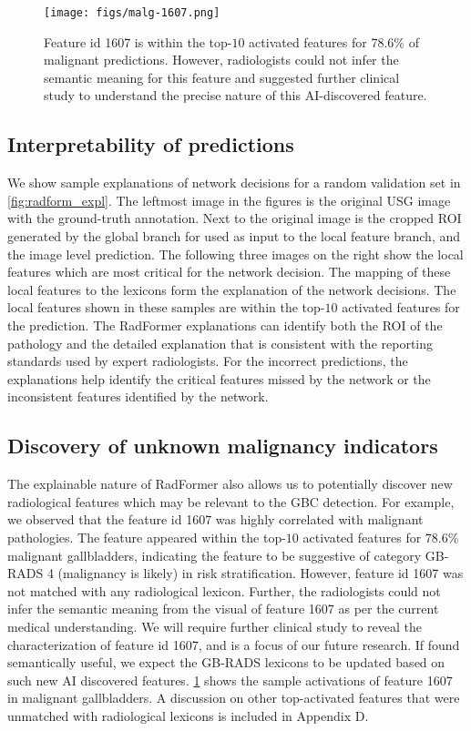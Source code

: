 \documentclass[twocolumn,final]{elsarticle}
\def\myarch{RadFormer\xspace}
\begin{document}
\begin{figure}[t]
	\centering
	\texttt{[image: figs/malg-1607.png]}
	\caption{Feature id 1607 is within the top-$10$ activated features for 78.6\% of malignant predictions. However, radiologists could not infer the semantic meaning for this feature and suggested further clinical study to understand the precise nature of this AI-discovered feature.}
	\label{fig:unknown_feat}
\end{figure}

\subsection{Interpretability of predictions}
%
We show sample explanations of network decisions for a random validation set in \cref{fig:radform_expl}. The leftmost image in the figures is the original USG image with the ground-truth annotation. Next to the original image is the cropped ROI generated by the global branch for used as input to the local feature branch, and the image level prediction. The following three images on the right show the local features which are most critical for the network decision. The mapping of these local features to the lexicons form the explanation of the network decisions. The local features shown in these samples are within the top-$10$ activated features for the prediction. The \myarch explanations can identify both the ROI of the pathology and the detailed explanation that is consistent with the reporting standards used by expert radiologists. For the incorrect predictions, the explanations help identify the critical features missed by the network or the inconsistent features identified by the network. 

\subsection{Discovery of unknown malignancy indicators}

The explainable nature of \myarch also allows us to potentially discover new radiological features which may be relevant to the GBC detection. For example, we observed that the feature id 1607 was highly correlated with malignant pathologies. The feature appeared within the top-$10$ activated features for 78.6\% malignant gallbladders, indicating the feature to be suggestive of category GB-RADS 4 (malignancy is likely) in risk stratification. However, feature id 1607 was not matched with any radiological lexicon. Further, the radiologists could not infer the semantic meaning from the visual of feature 1607 as per the current medical understanding. We will require further clinical study to reveal the characterization of feature id 1607, and is a focus of our future research. If found semantically useful, we expect the GB-RADS lexicons to be updated based on such new AI discovered features. \cref{fig:unknown_feat} shows the sample activations of feature 1607 in malignant gallbladders.
A discussion on other top-activated features that were unmatched with radiological lexicons is included in Appendix D.
\end{document}
